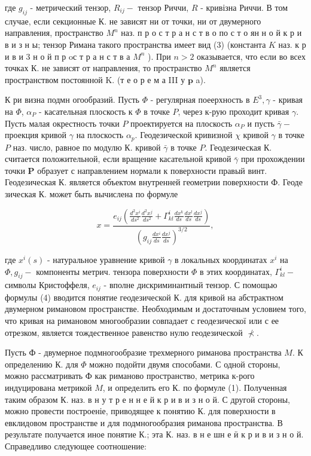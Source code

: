 \documentclass[10pt]{article}
\begin{document}
где $g_{i j}$ - метрический тензор, $R_{i j}-$ тензор Риччи, $R$ - кривізна Риччи. В том случае, если секционные К. не зависят ни от точки, ни от двумерного направления, пространство $M^{n}$ наз. п р о с т р а н с т в о по с т о ян н о й к р и в и з н ы; тензор Римана такого пространства имеет вид (3) (константа $K$ наз. к р и в и 3 н о й п р oс т р а н с т в а $M^{n}$ ). При $n>2$ оказывается, что если во всех точках К. не зависят от направления, то пространство $M^{n}$ является пространством постоянной $\mathrm{K}$. (т е о р е м а III у $\mathbf{p}$ a).



К ри визна подмн огообразий. Пусть $\Phi$ - регулярная поеерхность в $E^{3}, \gamma$ - кривая на $\Phi$, $\alpha_{P}$ - касательная плоскость к $\Phi$ в точке $P$, через к-рую проходит кривая $\gamma$. Пусть малая окрестность точки $P$ проектируется на плоскость $\alpha_{P}$ и пусть $\bar{\gamma}-$ проекция кривой $\gamma$ на плоскость $\alpha_{p}$. Геодезической кривизной $\chi$ кривой $\gamma$ в точке $P$ наз. число, равное по модулю $К$. кривой $\bar{\gamma}$ в точке $P$. Геодезическая К. считается положительной, если вращение касательной кривой $\bar{\gamma}$ при прохождении точки $\boldsymbol{P}$ образует с направлением нормали к поверхности правый винт. Геодезическая К. является объектом внутренней геометрии поверхности Ф. Геоде зическая К. может быть вычислена по формуле



\[

x=\frac{e_{i j}\left(\frac{d^{2} x^{i}}{d s^{2}} \frac{d^{2} x^{j}}{d s^{2}}+\Gamma_{k l}^{i} \frac{d x^{k}}{d s} \frac{d x^{l}}{d s} \frac{d x^{j}}{d s}\right)}{\left(g_{i j} \frac{d x^{i}}{d s} \frac{d x^{j}}{d s}\right)^{3 / 2}},

\]



где $x^{i}(s)$ - натуральное уравнение кривой $\gamma$ в локальных координатах $x^{i}$ на $\Phi, g_{i j}-$ компоненты метрич. тензора поверхности $\Phi$ в этих координатах, $\Gamma_{k l}^{i}-$ символы Кристоффеля, $e_{i j}$ - вполне дискриминантный тензор. С помощью формулы (4) вводится понятие геодезической $К$. для кривой на абстрактном двумерном римановом пространстве. Необходимым и достаточным условием того, что кривая на римановом многообразии совпадает с геодезическої или с ее отрезком, является тождественное равенство нулю геодезической $\nprec$.



Пусть Ф - двумерное подмногообразие трехмерного риманова пространства $M$. К определению К. для $\Phi$ можно подойти двумя способами. С одной стороны, можно рассматривать Ф как риманово пространство, метрика к-рого индуцирована метрикой $M$, и определить его К. по формуле (1). Полученная таким образом К. наз. в н у т р е н н е й к р и в и з н о й. С другой стороны, можно провести построеніе, приводящее к понятию К. для поверхности в евклидовом пространстве и для подмногообразия риманова пространства. В результате получается иное понятие К.; эта К. наз. в н е шн е ӥ к р и в и з н о й. Справедливо следующее соотношение:
\end{document}
